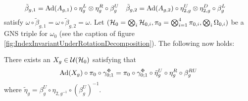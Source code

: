 \documentclass[11pt,a4paper,twoside]{article}
\numberwithin{equation}{section}
\begin{document}
\begin{align}
	\tilde{\beta}_{g,1}&=\Ad{A_{g,1}}\circ\eta_g^L\otimes\eta_g^R\circ\beta_g^U&\tilde{\beta}_{g,2}&=\Ad{A_{g,2}}\circ\eta_{2,g}^U\otimes\eta_{2,g}^D\circ\beta_g^L
\end{align}
satisfy $\omega\circ\tilde{\beta}_{g,1}=\omega\circ\tilde{\beta}_{g,2}=\omega$. Let $(\mathcal H_0=\bigotimes_i\mathcal H_{0,i},\pi_0=\bigotimes_{i=1}^4\pi_{0,i},\bigotimes_i\Omega_{0,i})$ be a GNS triple for $\omega_0$ (see the caption of figure \ref{fig:IndexInvariantUnderRotationDecomposition}). The following now holds:
\begin{lemma}\label{lem:DefinitionX_gLemma}
	There exists an $X_g\in\mathcal U(\mathcal H_0)$ satisfying that
	\begin{equation}\label{eq:DefinitionX_gLemma}
		\Ad{X_g}\circ\pi_0\circ\gamma^\Phi_{0;1}=\pi_0\circ\gamma^\Phi_{0;1}\circ\tilde{\eta}^U_g\circ\eta^R_g\circ\beta_g^{RU}
	\end{equation}
	where $\tilde{\eta}_g=\beta_g^U\circ\eta_{2,g^{-1}}\circ(\beta_g^U)^{-1}$.
\end{lemma}
\end{document}
